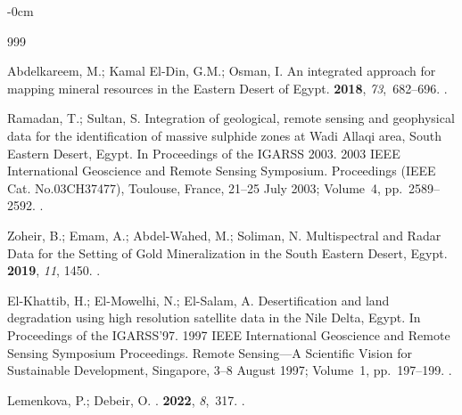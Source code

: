 \documentclass[information,article,accept,pdftex,moreauthors]{Definitions/mdpi}
\begin{document}
\begin{adjustwidth}{-\extralength}{0cm}

%
\begin{thebibliography}{999}

Abdelkareem, M.; {Kamal El-Din}, G.M.; Osman, I.
\newblock An integrated approach for mapping mineral resources in the Eastern
  Desert of Egypt.
 {\bf 2018}, {\em 73},~682--696.
.

Ramadan, T.; Sultan, S.
\newblock Integration of geological, remote sensing and geophysical data for
  the identification of massive sulphide zones at Wadi Allaqi area, South
  Eastern Desert, Egypt.
\newblock In Proceedings of the IGARSS 2003. 2003 IEEE International Geoscience
  and Remote Sensing Symposium. Proceedings (IEEE Cat. No.03CH37477), Toulouse, France, 21--25 July 2003; %
Volume~4, \mbox{pp. 2589--2592}.
.

Zoheir, B.; Emam, A.; Abdel-Wahed, M.; Soliman, N.
\newblock Multispectral and Radar Data for the Setting of Gold Mineralization
  in the South Eastern Desert, Egypt.
 {\bf 2019}, {\em 11}, 1450.
.

El-Khattib, H.; El-Mowelhi, N.; El-Salam, A.
\newblock Desertification and land degradation using high resolution satellite
  data in the Nile Delta, Egypt.
\newblock In Proceedings of the IGARSS'97. 1997 IEEE International Geoscience
  and Remote Sensing Symposium Proceedings. Remote Sensing---A Scientific
  Vision for Sustainable Development, Singapore, 3--8 August 1997; Volume~1, \mbox{pp. 197--199}. %
.

Lemenkova, P.; Debeir, O.
.
 {\bf 2022}, {\em 8},~317.
.


\end{thebibliography}
\end{adjustwidth}
\end{document}
